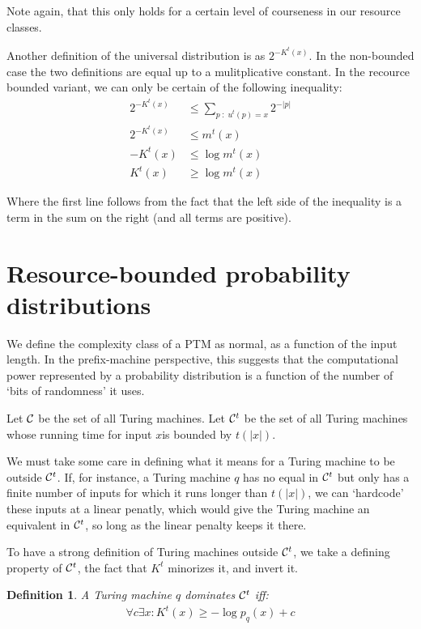 \documentclass[10pt,a4paper,oneside]{article}
\newtheorem{dfn}{Definition}
\begin{document}
Note again, that this only holds for a certain level of courseness in our resource classes.


Another definition of the universal distribution is as $2^{-K^t(x)}$. In the non-bounded case the two definitions are equal up to a mulitplicative constant. In the recource bounded variant, we can only be certain of the following inequality:
\begin{align*}
2^{-K^t(x)} &\leq \sum_{p\;:\;u^t(p) = x} 2^{-|p|}  \\
2^{-K^t(x)} &\leq m^t(x) \\
-K^t(x) &\leq \log m^t(x) \\ 
K^t(x) &\geq \log m^t(x)
\end{align*}

Where the first line follows from the fact that the left side of the inequality is a term in the sum on the right (and all terms are positive). 

\section*{Resource-bounded probability distributions}

We define the complexity class of a PTM as normal, as a function of the input length. In the prefix-machine perspective, this suggests that the computational power represented by a probability distribution is a function of the number of `bits of randomness' it uses.

Let $\cal C$ be the set of all Turing machines. Let ${\cal C}^t$ be the set of all Turing machines whose running time for input $x$is bounded by $t(|x|)$.

We must take some care in defining what it means for a Turing machine to be outside ${\cal C}^t$. If, for instance, a Turing machine $q$ has no equal in ${\cal C}^t$ but only has a finite number of inputs for which it runs longer than $t(|x|)$, we can `hardcode' these inputs at a linear penatly, which would give the Turing machine an equivalent in ${\cal C}^t$, so long as the linear penalty keeps it there. 

To have a strong definition of Turing machines outside ${\cal C}^t$, we take a defining property of ${\cal C}^t$, the fact that $K^t$ minorizes it, and invert it.
 
\begin{dfn}
A Turing machine $q$ dominates ${\cal C}^t$ iff:
\begin{align*}
\forall c \exists x : K^t(x) \geq -\log p_q(x) + c
\end{align*}
\label{dfn:domination}
\end{dfn}
\end{document}
